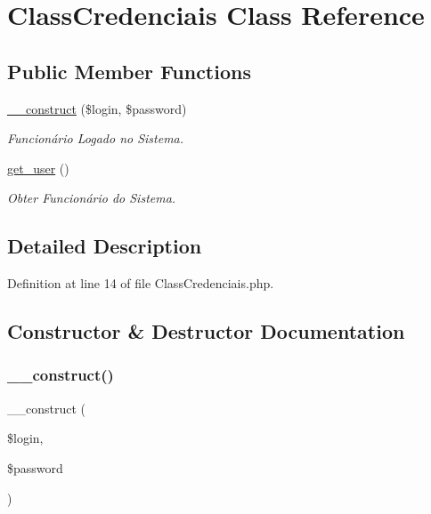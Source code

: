 \hypertarget{class_class_credenciais}{}\section{Class\+Credenciais Class Reference}
\label{class_class_credenciais}
\subsection*{Public Member Functions}
\begin{DoxyCompactItemize}
\item 
\hyperlink{class_class_credenciais_ab1b1798219f1ee41a4a007a6f3cb5437}{\+\_\+\+\_\+construct} (\$login, \$password)
\begin{DoxyCompactList}\small\item\em Funcionário Logado no Sistema. \end{DoxyCompactList}\item 
\hyperlink{class_class_credenciais_af0d0313a713f6caa332e53471a6e92bb}{get\+\_\+user} ()
\begin{DoxyCompactList}\small\item\em Obter Funcionário do Sistema. \end{DoxyCompactList}\end{DoxyCompactItemize}


\subsection{Detailed Description}


Definition at line 14 of file Class\+Credenciais.\+php.



\subsection{Constructor \& Destructor Documentation}
\mbox{\label{class_class_credenciais_ab1b1798219f1ee41a4a007a6f3cb5437}} 
\subsubsection{\texorpdfstring{\+\_\+\+\_\+construct()}{\_\_construct()}}
{\footnotesize\ttfamily \+\_\+\+\_\+construct (\begin{DoxyParamCaption}\item[{}]{\$login,  }\item[{}]{\$password }\end{DoxyParamCaption})}



